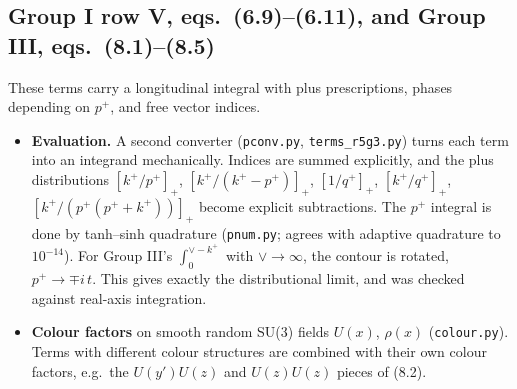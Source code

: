 \documentclass[10pt]{article}
\begin{document}
\subsection{Group I row V, eqs.~(6.9)--(6.11), and Group III, eqs.~(8.1)--(8.5)}\label{sec:r5g3}
These terms carry a longitudinal integral with plus prescriptions, phases depending on $p^+$, and free vector indices.
\begin{itemize}
\item \textbf{Evaluation.} A second converter (\texttt{pconv.py}, \texttt{terms\_r5g3.py}) turns each term into an integrand mechanically.
Indices are summed explicitly, and the plus distributions $[k^+/p^+]_+$, $[k^+/(k^+-p^+)]_+$, $[1/q^+]_+$, $[k^+/q^+]_+$, $[k^+/(p^+(p^++k^+))]_+$ become explicit subtractions.
The $p^+$ integral is done by tanh--sinh quadrature (\texttt{pnum.py}; agrees with adaptive quadrature to $10^{-14}$).
For Group III's $\int_0^{\vee-k^+}$ with $\vee\to\infty$, the contour is rotated, $p^+\to\mp i\,t$. This gives exactly the distributional limit,
and was checked against real-axis integration.
\item \textbf{Colour factors} on smooth random SU(3) fields $U(x)$, $\rho(x)$ (\texttt{colour.py}). Terms with different colour structures are combined with their own colour factors, e.g.\ the $U(y')U(z)$ and $U(z)U(z)$ pieces of (8.2).
\end{itemize}
\end{document}
